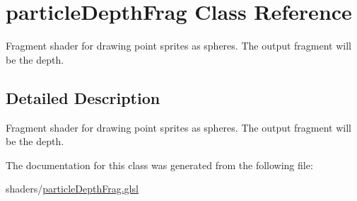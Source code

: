 \hypertarget{classparticle_depth_frag}{\section{particle\-Depth\-Frag Class Reference}
\label{classparticle_depth_frag}
}


Fragment shader for drawing point sprites as spheres. The output fragment will be the depth.  




\subsection{Detailed Description}
Fragment shader for drawing point sprites as spheres. The output fragment will be the depth. 

The documentation for this class was generated from the following file\-:\begin{DoxyCompactItemize}
\item 
shaders/\hyperlink{particle_depth_frag_8glsl}{particle\-Depth\-Frag.\-glsl}\end{DoxyCompactItemize}
